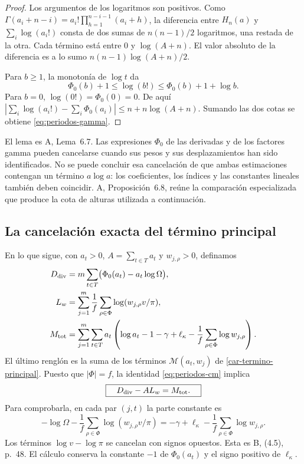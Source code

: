 \begin{proof}
Los argumentos de los logaritmos son positivos. Como
$\Gamma(a_i+n-i)=a_i!\prod_{h=1}^{n-i-1}(a_i+h)$,
la diferencia entre $H_n(a)$ y $\sum_i\log(a_i!)$ consta de
dos sumas de $n(n-1)/2$ logaritmos, una restada de la otra.
Cada término está entre $0$ y $\log(A+n)$. El valor absoluto
de la diferencia es a lo sumo
$n(n-1)\log(A+n)/2$.

Para $b\ge1$, la monotonía de $\log t$ da
\[
 \Phi_0(b)+1\le\log(b!)
             \le\Phi_0(b)+1+\log b.
\]
Para $b=0$, $\log(0!)=\Phi_0(0)=0$. De aquí
$|\sum_i\log(a_i!)-\sum_i\Phi_0(a_i)|
\le n+n\log(A+n)$. Sumando las dos cotas se obtiene
\eqref{eq:periodos-gamma}.
\end{proof}

El lema es A, Lema~6.7. Las expresiones $\Phi_0$ de las derivadas
y de los factores gamma pueden cancelarse cuando sus pesos y sus
desplazamientos han sido identificados. No se puede concluir esa
cancelación de que ambas estimaciones contengan un término
$a\log a$: los coeficientes, los índices y las constantes lineales
también deben coincidir. A, Proposición~6.8, reúne la comparación
especializada que produce la cota de alturas utilizada a continuación.

\subsection{La cancelación exacta del término principal}

En lo que sigue, con $a_t>0$, $A=\sum_{t\in T}a_t$ y
$w_{j,\rho}>0$, definamos
\begin{align}
 D_{\rm div}
   &=m\sum_{t\in T}\bigl(\Phi_0(a_t)-a_t\log\Omega\bigr),
       \label{eq:periodos-ddiv}\\
 L_w&=\sum_{j=1}^m\frac1f\sum_{\rho\in\Phi}
                           \log(w_{j,\rho}v/\pi),
       \label{eq:periodos-lw}\\
 M_{\rm tot}
   &=\sum_{j=1}^m\sum_{t\in T}a_t
       \left(\log a_t-1-\gamma+\ell_\kappa
                     -\frac1f\sum_{\rho\in\Phi}\log w_{j,\rho}\right).
       \label{eq:periodos-mtot}
\end{align}
El último renglón es la suma de los términos
$\mathcal M(a_t,w_j)$ de \eqref{car-termino-principal}.
Puesto que $|\Phi|=f$, la identidad
\eqref{eq:periodos-cm} implica
\begin{equation}
 \boxed{\quad D_{\rm div}-AL_w=M_{\rm tot}.\quad}
 \label{eq:periodos-cancelacion}
\end{equation}
Para comprobarla, en cada par $(j,t)$ la parte constante es
\[
 -\log\Omega-\frac1f\sum_{\rho\in\Phi}\log(w_{j,\rho}v/\pi)
 =-\gamma+\ell_\kappa-\frac1f\sum_{\rho\in\Phi}\log w_{j,\rho}.
\]
Los términos $\log v-\log\pi$ se cancelan con signos opuestos.
Esta es B, (4.5), p.~48. El cálculo conserva la constante $-1$ de
$\Phi_0(a_t)$ y el signo positivo de $\ell_\kappa$.

